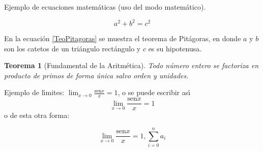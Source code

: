 \documentclass{article}
\newtheorem{teo}{Teorema}
\newcommand{\sen}{\ensuremath{\mathrm{sen}}}
\begin{document}
Ejemplo de ecuaciones matem\'aticas (uso del modo matem\'atico).

\begin{equation}
 a^2 + b^2 = c^2\label{TeoPitagoras}
\end{equation}

En la ecuaci\'on \ref{TeoPitagoras} se muestra el teorema de
Pit\'agoras, en donde $a$ y $b$ son los catetos de un tri\'angulo
rect\'angulo y $c$ es su hipotenusa.

\begin{teo}[Fundamental de la Aritm\'etica]

  Todo n\'umero entero se factoriza en producto de primos de forma
  \'unica salvo orden y unidades.

\end{teo}

Ejemplo de l\'{\i}mites: $\lim_{x \rightarrow 0} \frac{\sen x}{x}=1$,
o se puede escribir as\'{\i} $$\lim_{x \rightarrow 0} \frac{\sen
  x}{x}=1$$ o de esta otra forma:

\[\lim_{x \rightarrow 0} \frac{\sen x}{x}=1, \sum_{i=0}^n a_i\]
\end{document}
